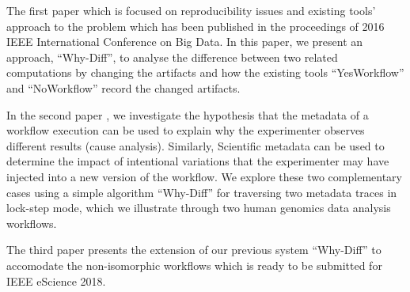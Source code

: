 \documentclass[10pt,conference,twocolumn]{IEEEtran}
\begin{document}
The first paper \cite{thavasimani2016} which is focused on reproducibility issues and existing tools' approach to the problem which has been published in
the proceedings of 2016 IEEE International Conference on
Big Data. In this paper, we present an approach, “Why-Diff”, to analyse the difference between two related computations by changing the artifacts and how the existing tools “YesWorkflow” and “NoWorkflow” record the changed artifacts.

In the second paper \cite{Priyaa}, we investigate the hypothesis that the metadata of a workflow execution can be used to explain why the experimenter observes different results (cause analysis). Similarly, Scientific metadata can be used to determine the impact of intentional variations that the experimenter may have injected into a new version of the workflow. We explore these two complementary cases using a simple algorithm \enquote{Why-Diff} for traversing two metadata traces in lock-step mode, which we illustrate through two human genomics data analysis workflows.

The third paper presents the extension of our previous system \enquote{Why-Diff} to accomodate the non-isomorphic workflows which is ready to be submitted for IEEE eScience 2018.
\end{document}
